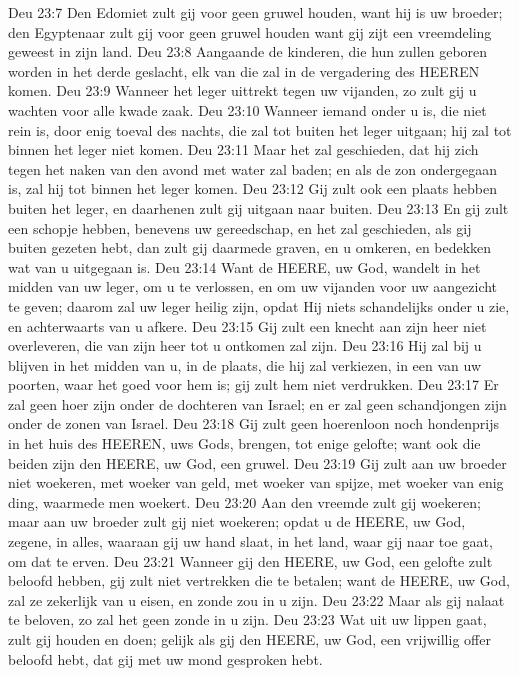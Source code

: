 Deu 23:7  Den Edomiet zult gij voor geen gruwel houden, want hij is uw broeder; den Egyptenaar zult gij voor geen gruwel houden want gij zijt een vreemdeling geweest in zijn land.
Deu 23:8  Aangaande de kinderen, die hun zullen geboren worden in het derde geslacht, elk van die zal in de vergadering des HEEREN komen.
Deu 23:9  Wanneer het leger uittrekt tegen uw vijanden, zo zult gij u wachten voor alle kwade zaak.
Deu 23:10  Wanneer iemand onder u is, die niet rein is, door enig toeval des nachts, die zal tot buiten het leger uitgaan; hij zal tot binnen het leger niet komen.
Deu 23:11  Maar het zal geschieden, dat hij zich tegen het naken van den avond met water zal baden; en als de zon ondergegaan is, zal hij tot binnen het leger komen.
Deu 23:12  Gij zult ook een plaats hebben buiten het leger, en daarhenen zult gij uitgaan naar buiten.
Deu 23:13  En gij zult een schopje hebben, benevens uw gereedschap, en het zal geschieden, als gij buiten gezeten hebt, dan zult gij daarmede graven, en u omkeren, en bedekken wat van u uitgegaan is.
Deu 23:14  Want de HEERE, uw God, wandelt in het midden van uw leger, om u te verlossen, en om uw vijanden voor uw aangezicht te geven; daarom zal uw leger heilig zijn, opdat Hij niets schandelijks onder u zie, en achterwaarts van u afkere.
Deu 23:15  Gij zult een knecht aan zijn heer niet overleveren, die van zijn heer tot u ontkomen zal zijn.
Deu 23:16  Hij zal bij u blijven in het midden van u, in de plaats, die hij zal verkiezen, in een van uw poorten, waar het goed voor hem is; gij zult hem niet verdrukken.
Deu 23:17  Er zal geen hoer zijn onder de dochteren van Israel; en er zal geen schandjongen zijn onder de zonen van Israel.
Deu 23:18  Gij zult geen hoerenloon noch hondenprijs in het huis des HEEREN, uws Gods, brengen, tot enige gelofte; want ook die beiden zijn den HEERE, uw God, een gruwel.
Deu 23:19  Gij zult aan uw broeder niet woekeren, met woeker van geld, met woeker van spijze, met woeker van enig ding, waarmede men woekert.
Deu 23:20  Aan den vreemde zult gij woekeren; maar aan uw broeder zult gij niet woekeren; opdat u de HEERE, uw God, zegene, in alles, waaraan gij uw hand slaat, in het land, waar gij naar toe gaat, om dat te erven.
Deu 23:21  Wanneer gij den HEERE, uw God, een gelofte zult beloofd hebben, gij zult niet vertrekken die te betalen; want de HEERE, uw God, zal ze zekerlijk van u eisen, en zonde zou in u zijn.
Deu 23:22  Maar als gij nalaat te beloven, zo zal het geen zonde in u zijn.
Deu 23:23  Wat uit uw lippen gaat, zult gij houden en doen; gelijk als gij den HEERE, uw God, een vrijwillig offer beloofd hebt, dat gij met uw mond gesproken hebt.

